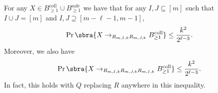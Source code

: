 \begin{lemma}\label{lem:anything transition into coll}
    For any $X\in B_{\geq 1}^{\mathrm{coll}}\cup B_{\geq 1}^{\mathrm{safe}}$ we have that for any $I,J\subseteq[m]$ such that $I\cup J=[m]$ and $I,J\supseteq [m-\ell-1,m-1]$,
    \begin{align*}
        \Pr\sbra{X\to_{R_{m,I,k}R_{m,J,k}} B_{\geq 1}^{\mathrm{coll}}}
        \leq\frac{k^2}{2^{\ell-3}}.
    \end{align*}
    Moreover, we also have
    \begin{align*}
        \Pr\sbra{X\to_{R_{m,I,k}R_{m,J,k}R_{m,I,k}} B_{\geq 1}^{\mathrm{coll}}}
        \leq\frac{k^2}{2^{\ell-3}}.
    \end{align*}
    In fact, this holds with $Q$ replacing $R$ anywhere in this inequality.
\end{lemma}
